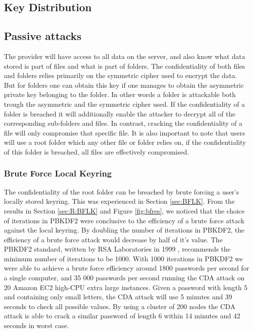 \documentclass[pdftex,english,10pt,b5paper,twoside]{book}
\begin{document}
\subsection{Key Distribution}
\label{sec:DI:keydist}

\subsection{Passive attacks}
The provider will have access to all data on the server, and also know what
data stored is part of files and what is part of folders. The confidentiality
of both files and folders relies primarily on the symmetric cipher used to
encrypt the data. But for folders one can obtain this key if one manages to
obtain the asymmetric private key belonging to the folder. In other words a
folder is attackable both trough the asymmetric and the symmetric cipher used.
If the confidentiality of a folder is breached it will additionally enable the
attacker to decrypt all of the corresponding sub-folders and files. In contrast,
cracking the confidentiality of a file will only compromise that specific file. It is
also important to note that users will use a root folder which any other file
or folder relies on, if the confidentiality of this folder is breached, all
files are effectively compromised.

\subsubsection{Brute Force Local Keyring}
The confidentiality of the root folder can be breached by brute forcing a user's
locally stored keyring. This was experienced in Section \ref{sec:BFLK}. From the
results in Section \ref{sec:R:BFLK} and Figure \ref{fig:bfres}, we noticed
that the choice of iterations in PBKDF2 were conclusive to the efficiency of a
brute force attack against the local keyring. By doubling the number of
iterations in PBKDF2, the efficiency of a brute force attack would decrease by
half of it's value. The PBKDF2 standard, written by RSA Laboratories in 1999 \cite{PBKDF2std},
recommends the minimum number of iterations to be 1000. With 1000 iterations in
PBKDF2 we were able to achieve a brute force efficiency around 1800 passwords
per second for a single computer, and 35 000 passwords per second running the
CDA attack on 20 Amazon EC2 high-CPU extra large instances. Given a password
with length 5 and containing only small letters, the CDA attack will use 5
minutes and 39 seconds to check all possible values. By using a cluster of 200
nodes the CDA attack is able to crack a similar password of length 6 within 14 minutes
and 42 seconds in worst case.\\
\end{document}
